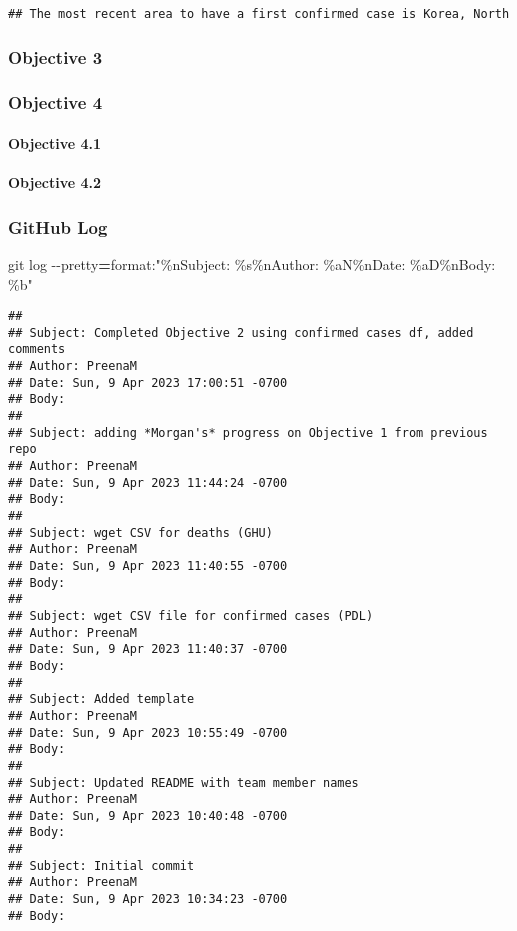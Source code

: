 \documentclass[
]{article}
\newenvironment{Shaded}{\begin{snugshade}}{\end{snugshade}}
\newcommand{\AttributeTok}[1]{\textcolor[rgb]{0.77,0.63,0.00}{#1}}
\newcommand{\FunctionTok}[1]{\textcolor[rgb]{0.00,0.00,0.00}{#1}}
\newcommand{\NormalTok}[1]{#1}
\newcommand{\OperatorTok}[1]{\textcolor[rgb]{0.81,0.36,0.00}{\textbf{#1}}}
\newcommand{\StringTok}[1]{\textcolor[rgb]{0.31,0.60,0.02}{#1}}
\begin{document}
\begin{verbatim}
## The most recent area to have a first confirmed case is Korea, North
\end{verbatim}

\hypertarget{objective-3}{%
\subsubsection{Objective 3}\label{objective-3}}

\hypertarget{objective-4}{%
\subsubsection{Objective 4}\label{objective-4}}

\hypertarget{objective-4.1}{%
\paragraph{Objective 4.1}\label{objective-4.1}}

\hypertarget{objective-4.2}{%
\paragraph{Objective 4.2}\label{objective-4.2}}

\hypertarget{github-log}{%
\subsubsection{GitHub Log}\label{github-log}}

\begin{Shaded}
\begin{Highlighting}[]
\FunctionTok{git}\NormalTok{ log }\AttributeTok{{-}{-}pretty}\OperatorTok{=}\NormalTok{format:}\StringTok{"\%nSubject: \%s\%nAuthor: \%aN\%nDate: \%aD\%nBody: \%b"}
\end{Highlighting}
\end{Shaded}

\begin{verbatim}
## 
## Subject: Completed Objective 2 using confirmed cases df, added comments
## Author: PreenaM
## Date: Sun, 9 Apr 2023 17:00:51 -0700
## Body: 
## 
## Subject: adding *Morgan's* progress on Objective 1 from previous repo
## Author: PreenaM
## Date: Sun, 9 Apr 2023 11:44:24 -0700
## Body: 
## 
## Subject: wget CSV for deaths (GHU)
## Author: PreenaM
## Date: Sun, 9 Apr 2023 11:40:55 -0700
## Body: 
## 
## Subject: wget CSV file for confirmed cases (PDL)
## Author: PreenaM
## Date: Sun, 9 Apr 2023 11:40:37 -0700
## Body: 
## 
## Subject: Added template
## Author: PreenaM
## Date: Sun, 9 Apr 2023 10:55:49 -0700
## Body: 
## 
## Subject: Updated README with team member names
## Author: PreenaM
## Date: Sun, 9 Apr 2023 10:40:48 -0700
## Body: 
## 
## Subject: Initial commit
## Author: PreenaM
## Date: Sun, 9 Apr 2023 10:34:23 -0700
## Body:
\end{verbatim}
\end{document}
